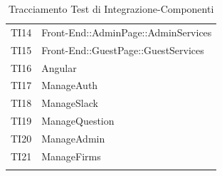 \documentclass[../PianoDiQualifica_v4.0.0.tex]{subfiles}
\begin{document}
\begin{longtable}[c] { >{\centering\arraybackslash}p{2cm} >{\centering\arraybackslash}p{11cm}}
			\addlinespace[0.3em]
			\midrule
			\addlinespace[0.3em]
			TI14 & Front-End::AdminPage::AdminServices \\
			\addlinespace[0.3em]
			\midrule
			\addlinespace[0.3em]
			TI15 & Front-End::GuestPage::GuestServices \\
			\addlinespace[0.3em]
			\midrule
			\addlinespace[0.3em]
			TI16 & Angular \\
			\addlinespace[0.3em]
			\midrule
			\addlinespace[0.3em]
			TI17 & ManageAuth \\
			\addlinespace[0.3em]
			\midrule
			\addlinespace[0.3em]
			TI18 & ManageSlack \\
			\addlinespace[0.3em]
			\midrule
			\addlinespace[0.3em]
			TI19 & ManageQuestion \\
			\addlinespace[0.3em]
			\midrule
			\addlinespace[0.3em]
			TI20 & ManageAdmin \\
			\addlinespace[0.3em]
			\midrule
			\addlinespace[0.3em]
			TI21 & ManageFirms \\
			\bottomrule
			\caption{Tracciamento Test di Integrazione-Componenti}
	\end{longtable}

	\newpage
\end{document}
